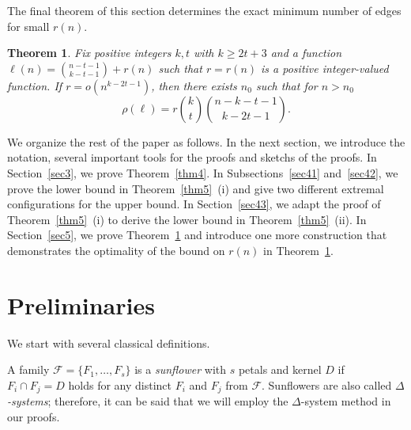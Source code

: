 \documentclass[12pt,a4paper]{article}
\newtheorem{Theorem}{Theorem}
\def\marrow{{\boldmath {\marginpar[\hfill$\rightarrow \rightarrow$]{$\leftarrow \leftarrow$}}}}
\def\andrey#1{{\sc Andrey: }{\marrow\sf \textcolor{blue}{#1}}}
\begin{document}
The final theorem of this section determines the exact minimum number of edges for small  $r(n)$.

\begin{Theorem}\label{thm6}
    Fix positive integers $k,t$ with $k \geqslant 2t+3$ and a function $\ell(n) = \binom{n-t-1}{k-t-1} + r(n)$ such that $r=r(n)$ is a positive integer-valued function. If $r=o(n^{k-2t-1})$, then there exists $n_0$ such that for $n > n_0$
    $$\rho(\ell) = r \binom{k}{t}\binom{n-k-t-1}{k-2t-1}.$$
\end{Theorem}

We organize the rest of the paper as follows. In the next section, we introduce the notation, several important tools for the proofs and sketchs of the proofs. In Section~\ref{sec3}, we prove Theorem~\ref{thm4}. In Subsections~\ref{sec41} and~\ref{sec42}, we prove the lower bound in Theorem~\ref{thm5}~(i) and give two different extremal configurations for the upper bound. In Section~\ref{sec43}, we adapt the proof of Theorem~\ref{thm5}~(i) to derive the lower bound in Theorem~\ref{thm5}~(ii). In Section~\ref{sec5}, we prove Theorem~\ref{thm6} and introduce one more construction that demonstrates the optimality of the bound on $r(n)$ in Theorem~\ref{thm6}. 


\section{Preliminaries}\label{sec2}

We start with several classical definitions.

A family $\mathcal{F} = \{F_1, \ldots, F_s\}$ is a \textit{sunflower} with $s$ petals and kernel $D$ if $F_i \cap F_j = D$ holds for any distinct $F_i$ and $F_j$ from $\mathcal{F}$. Sunflowers are also called \textit{$\Delta$-systems}; therefore, it can be said that we will employ the $\Delta$-system method in our proofs.
\end{document}
